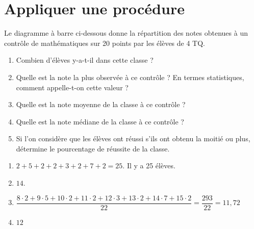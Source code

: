 \documentclass[main.tex]{subfiles}
\begin{document}
\section{Appliquer une procédure}
\begin{exercise}[points=5]
    Le diagramme à barre ci-dessous donne la répartition des notes obtenues à un contrôle de mathématiques sur 20 points par les élèves de 4 TQ.
    \begin{center}
        
    \end{center}
    \begin{enumerate}
        \item Combien d'élèves y-a-t-il dans cette classe ?
        \item Quelle est la note la plus observée à ce contrôle ? En termes statistiques, comment appelle-t-on cette valeur ?
        \item Quelle est la note moyenne de la classe à ce contrôle ?
        \item Quelle est la note médiane de la classe à ce contrôle ?
        \item Si l'on considère que les élèves ont réussi s'ils ont obtenu la moitié ou plus, détermine le pourcentage de réussite de la classe.
    \end{enumerate}
\end{exercise}
\begin{solution}
    \begin{enumerate}
        \item $2+5+2+2+3+2+7+2 = 25$. Il y a 25 élèves.
        \item $14$.
        \item $\dfrac{8\cdot 2+9\cdot 5+10\cdot 2+11\cdot 2+12\cdot 3+13\cdot 2+14\cdot 7+15\cdot 2}{22} = \dfrac{293}{22}=11,72$
        \item $12$
    \end{enumerate}
\end{solution}
\end{document}

